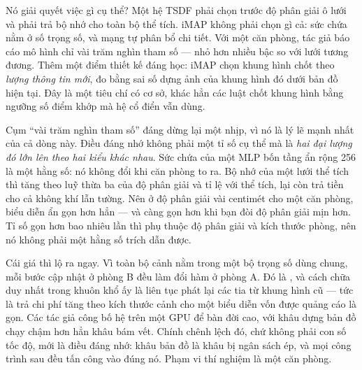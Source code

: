 \documentclass[../../deep_learning.tex]{subfiles}
\begin{document}
Nó giải quyết việc gì cụ thể? Một hệ TSDF phải chọn trước độ phân giải ô lưới và phải trả bộ nhớ cho toàn bộ thể tích. iMAP không phải chọn gì cả: sức chứa nằm ở số trọng số, và mạng tự phân bổ chi tiết. Với một căn phòng, tác giả báo cáo mô hình chỉ vài trăm nghìn tham số --- nhỏ hơn nhiều bậc so với lưới tương đương. Thêm một điểm thiết kế đáng học: iMAP chọn khung hình chốt theo \emph{lượng thông tin mới}, đo bằng sai số dựng ảnh của khung hình đó dưới bản đồ hiện tại. Đây là một tiêu chí có cơ sở, khác hẳn các luật chốt khung hình bằng ngưỡng số điểm khớp mà hệ cổ điển vẫn dùng.

Cụm ``vài trăm nghìn tham số'' đáng dừng lại một nhịp, vì nó là lý lẽ mạnh nhất của cả dòng này. Điều đáng nhớ không phải một tỉ số cụ thể mà là \emph{hai đại lượng đó lớn lên theo hai kiểu khác nhau}. Sức chứa của một MLP bốn tầng ẩn rộng 256 là một hằng số: nó không đổi khi căn phòng to ra. Bộ nhớ của một lưới thể tích thì tăng theo luỹ thừa ba của độ phân giải và tỉ lệ với thể tích, lại còn trả tiền cho cả không khí lẫn tường. Nên ở độ phân giải vài centimét cho một căn phòng, biểu diễn ẩn gọn hơn hẳn --- và càng gọn hơn khi bạn đòi độ phân giải mịn hơn. Tỉ số gọn hơn bao nhiêu lần thì phụ thuộc độ phân giải và kích thước phòng, nên nó không phải một hằng số trích dẫn được.

Cái giá thì lộ ra ngay. Vì toàn bộ cảnh nằm trong một bộ trọng số dùng chung, mỗi bước cập nhật ở phòng B đều làm đổi hàm ở phòng A. Đó là , và cách chữa duy nhất trong khuôn khổ ấy là liên tục phát lại các tia từ khung hình cũ --- tức là trả chi phí tăng theo kích thước cảnh cho một biểu diễn vốn được quảng cáo là gọn. Các tác giả công bố hệ trên một GPU để bàn đời cao, với khâu dựng bản đồ chạy chậm hơn hẳn khâu bám vết. Chính chênh lệch đó, chứ không phải con số tốc độ, mới là điều đáng nhớ: khâu bản đồ là khâu bị ngân sách ép, và mọi công trình sau đều tấn công vào đúng nó. Phạm vi thí nghiệm là một căn phòng.
\end{document}
